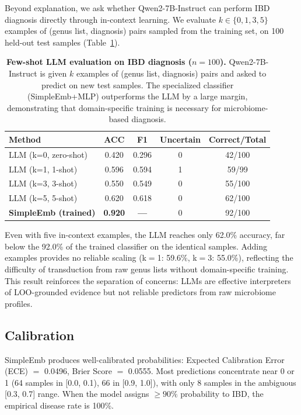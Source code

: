 \documentclass[11pt,a4paper]{article}
\begin{document}
Beyond explanation, we ask whether Qwen2-7B-Instruct can perform IBD diagnosis directly through in-context learning. We evaluate $k\in\{0,1,3,5\}$ examples of (genus list, diagnosis) pairs sampled from the training set, on 100 held-out test samples (Table~\ref{tab:fewshot}).

\begin{table}[ht]
\centering
\caption{\textbf{Few-shot LLM evaluation on IBD diagnosis ($n{=}100$).}
Qwen2-7B-Instruct is given $k$ examples of (genus list, diagnosis) pairs and asked to predict on new test samples. The specialized classifier (SimpleEmb+MLP) outperforms the LLM by a large margin, demonstrating that domain-specific training is necessary for microbiome-based diagnosis.}
\label{tab:fewshot}
\begin{tabular}{lcccc}
\toprule
\textbf{Method} & \textbf{ACC} & \textbf{F1} & \textbf{Uncertain} & \textbf{Correct/Total} \\
\midrule
LLM (k=0, zero-shot) & 0.420 & 0.296 & 0 & 42/100 \\
LLM (k=1, 1-shot) & 0.596 & 0.594 & 1 & 59/99 \\
LLM (k=3, 3-shot) & 0.550 & 0.549 & 0 & 55/100 \\
LLM (k=5, 5-shot) & 0.620 & 0.618 & 0 & 62/100 \\
\midrule
\textbf{SimpleEmb (trained)} & \textbf{0.920} & \textbf{---} & 0 & 92/100 \\
\bottomrule
\end{tabular}
\end{table}

Even with five in-context examples, the LLM reaches only 62.0\% accuracy, far below the 92.0\% of the trained classifier on the identical samples. Adding examples provides no reliable scaling (k$=$1: 59.6\%, k$=$3: 55.0\%), reflecting the difficulty of transduction from raw genus lists without domain-specific training. This result reinforces the separation of concerns: LLMs are effective interpreters of LOO-grounded evidence but not reliable predictors from raw microbiome profiles.

\subsection{Calibration}

SimpleEmb produces well-calibrated probabilities: Expected Calibration Error (ECE) $=$ 0.0496, Brier Score $=$ 0.0555. Most predictions concentrate near 0 or 1 (64 samples in [0.0, 0.1), 66 in [0.9, 1.0]), with only 8 samples in the ambiguous [0.3, 0.7] range. When the model assigns ${\geq}90\%$ probability to IBD, the empirical disease rate is 100\%.
\end{document}
